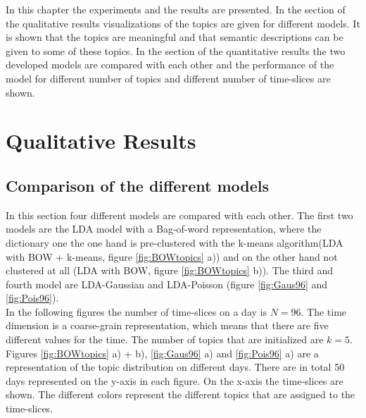 In this chapter the experiments and the results are presented. In the section of the qualitative results visualizations of the topics are given for different models. It is shown that the topics are meaningful and that semantic descriptions can be given to some of these topics.
In the section of the quantitative results the two developed models are compared with each other and the performance of the model for different number of topics and different number of time-slices are shown.

\section{Qualitative Results}
\subsection{Comparison of the different models}
In this section four different models are compared with each other. The first two models are the LDA model with a Bag-of-word representation, where the dictionary one the one hand is pre-clustered with the k-means algorithm(LDA with BOW + k-means, figure \ref{fig:BOWtopics} a)) and on the other hand not clustered at all (LDA with BOW, figure \ref{fig:BOWtopics} b)). The third and fourth model are LDA-Gaussian and LDA-Poisson (figure \ref{fig:Gaus96} and \ref{fig:Pois96}).\\

In the following figures the number of time-slices on a day is $N=96$. The time dimension is a coarse-grain representation, which means that there are five different values for the time. The number of topics that are initialized are $k=5$. Figures \ref{fig:BOWtopics} a) + b), \ref{fig:Gaus96} a) and \ref{fig:Pois96} a) are a representation of the topic distribution on different days. There are in total 50 days represented on the y-axis in each figure. On the x-axis the time-slices are shown. The different colors represent the different topics that are assigned to the time-slices.\\

